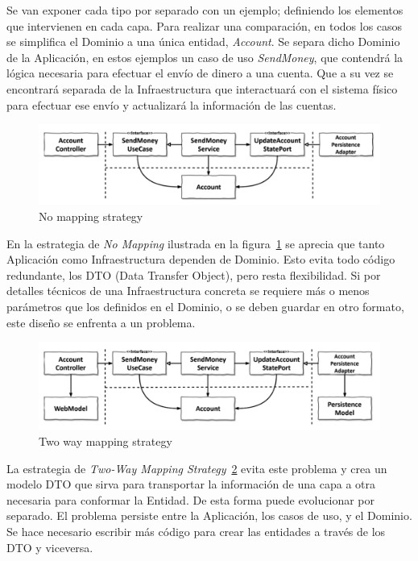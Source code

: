 Se van exponer cada tipo por separado con un ejemplo;
definiendo los elementos que intervienen en cada capa.
Para realizar una comparación, en todos los casos se simplifica el Dominio a una única entidad, \textit{Account}.
Se separa dicho Dominio de la Aplicación, en estos ejemplos un caso de uso \textit{SendMoney}, que contendrá la lógica necesaria para efectuar el envío de dinero a una cuenta.
Que a su vez se encontrará separada de la Infraestructura que interactuará con el sistema físico para efectuar ese envío y actualizará la información de las cuentas.

\begin{figure}[H]
    \centering
    \includegraphics[height=0.1\textheight]{./part/Ejecucion/Seguimiento/CreateTaskUseCase/img/nomapping}
    \caption{No mapping strategy~\cite{TomHombergs2019GYHD}}\label{fig:nomapping}
\end{figure}

En la estrategia de \textit{No Mapping} ilustrada en la figura~\cref{fig:nomapping} se aprecia que tanto Aplicación como Infraestructura dependen de Dominio.
Esto evita todo código redundante, los \gls{DTO} (Data Transfer Object), pero resta flexibilidad.
Si por detalles técnicos de una Infraestructura concreta se requiere más o menos parámetros que los definidos en el Dominio, o se deben guardar en otro formato, este diseño se enfrenta a un problema.

\begin{figure}[H]
    \centering
    \includegraphics[height=0.1\textheight]{./part/Ejecucion/Seguimiento/CreateTaskUseCase/img/twowaymapping}
    \caption{Two way mapping strategy~\cite{TomHombergs2019GYHD}}\label{fig:twowaymapping}
\end{figure}

La estrategia de \textit{Two-Way Mapping Strategy}~\cref{fig:twowaymapping} evita este problema y crea un modelo DTO que sirva para transportar la información de una capa a otra necesaria para conformar la Entidad.
De esta forma puede evolucionar por separado.
El problema persiste entre la Aplicación, los casos de uso, y el Dominio.
Se hace necesario escribir más código para crear las entidades a través de los DTO y viceversa.

